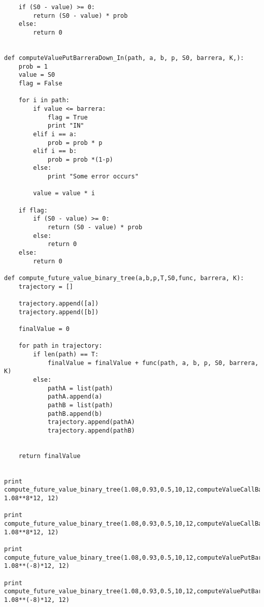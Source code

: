 \documentclass{apuntes}
\begin{document}
\begin{lstlisting}
	if (S0 - value) >= 0:
		return (S0 - value) * prob
	else:
		return 0


def computeValuePutBarreraDown_In(path, a, b, p, S0, barrera, K,):
	prob = 1
	value = S0
	flag = False

	for i in path:
		if value <= barrera:
			flag = True
			print "IN"
		elif i == a:
			prob = prob * p
		elif i == b:
			prob = prob *(1-p)
		else:
			print "Some error occurs"

		value = value * i

	if flag:
		if (S0 - value) >= 0:
			return (S0 - value) * prob
		else:
			return 0
	else:
		return 0

def compute_future_value_binary_tree(a,b,p,T,S0,func, barrera, K):
	trajectory = []

	trajectory.append([a])
	trajectory.append([b])

	finalValue = 0

	for path in trajectory:
		if len(path) == T:
			finalValue = finalValue + func(path, a, b, p, S0, barrera, K)
		else:
			pathA = list(path)
			pathA.append(a)
			pathB = list(path)
			pathB.append(b)
			trajectory.append(pathA)
			trajectory.append(pathB)


	return finalValue


print compute_future_value_binary_tree(1.08,0.93,0.5,10,12,computeValueCallBarreraUp_Out, 1.08**8*12, 12)

print compute_future_value_binary_tree(1.08,0.93,0.5,10,12,computeValueCallBarreraUp_In, 1.08**8*12, 12)

print compute_future_value_binary_tree(1.08,0.93,0.5,10,12,computeValuePutBarreraDown_Out, 1.08**(-8)*12, 12)

print compute_future_value_binary_tree(1.08,0.93,0.5,10,12,computeValuePutBarreraDown_In, 1.08**(-8)*12, 12)
\end{lstlisting}

\printindex
\end{document}
